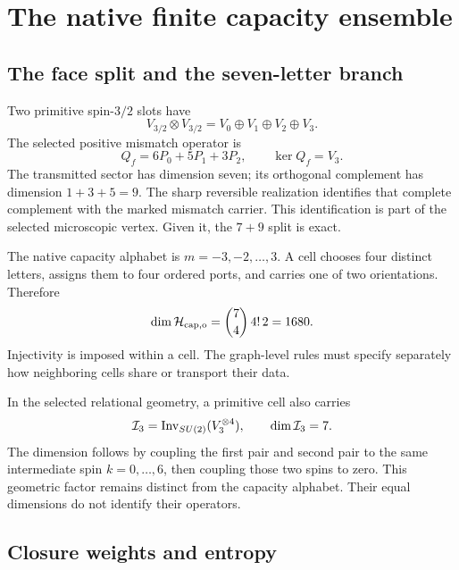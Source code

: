 \section{The native finite capacity ensemble}
\label{sec:capacity}

\subsection{The face split and the seven-letter branch}

Two primitive spin-$3/2$ slots have
\begin{equation}
V_{3/2}\otimes V_{3/2}=V_0\oplus V_1\oplus V_2\oplus V_3.
\end{equation}
The selected positive mismatch operator is
\begin{equation}
Q_f=6P_0+5P_1+3P_2,\qquad \ker Q_f=V_3.
\label{eq:faceQ}
\end{equation}
The transmitted sector has dimension seven; its orthogonal complement has dimension $1+3+5=9$. The sharp reversible realization identifies that complete complement with the marked mismatch carrier. This identification is part of the selected microscopic vertex. Given it, the $7+9$ split is exact.

The native capacity alphabet is $m=-3,-2,\ldots,3$. A cell chooses four distinct letters, assigns them to four ordered ports, and carries one of two orientations. Therefore
\begin{equation}
\dim\mathcal H_{\rm cap,o}
=\binom74\,4!\,2=1680.
\label{eq:count}
\end{equation}
Injectivity is imposed within a cell. The graph-level rules must specify separately how neighboring cells share or transport their data.

In the selected relational geometry, a primitive cell also carries
\begin{equation}
\mathcal I_3=\operatorname{Inv}_{SU(2)}(V_3^{\otimes4}),\qquad \dim\mathcal I_3=7.
\end{equation}
The dimension follows by coupling the first pair and second pair to the same intermediate spin $k=0,\ldots,6$, then coupling those two spins to zero. This geometric factor remains distinct from the capacity alphabet. Their equal dimensions do not identify their operators.

\subsection{Closure weights and entropy}


